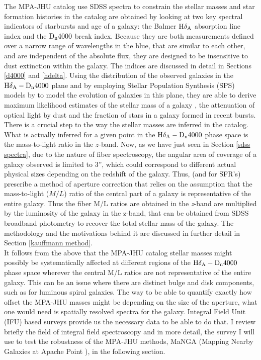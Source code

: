 The MPA-JHU catalog use SDSS spectra to constrain the stellar masses and star formation histories in the catalog are obtained by looking at two key spectral indicators of starbursts and age of a galaxy: the Balmer ${\rm H}\delta_{\rm A}$ absorption line index and the ${\rm D}_{\rm n}4000$ break index.   Because they are both measurements defined over a narrow range of wavelengths in the blue, that are similar to each other, and are independent of the absolute flux, they are designed to be insensitive to dust extinction within the galaxy. The indices are discussed in detail in Sections \ref{d4000} and \ref{hdelta}. Using the distribution of the observed galaxies in the ${\rm H}\delta_{\rm A}-{\rm D}_{\rm n}4000$ plane and by employing Stellar Population Synthesis (SPS) models by \citet{bruzual_stellar_2003-1} to model the evolution of galaxies in this plane, they are able to derive maximum likelihood estimates of the stellar mass of a galaxy \citep{kauffmann_stellar_2003}, the attenuation of optical light by dust and the fraction of stars in a galaxy formed in recent bursts.\\

There is a crucial step to the way the stellar masses are inferred in the catalog. What is actually inferred for a given point in the ${\rm H}\delta_{\rm A}-{\rm D}_{\rm n}4000$ phase space is the mass-to-light ratio in the $z$-band. Now, as we have just seen in Section \ref{sdss spectra}, due to the nature of fiber spectroscopy, the angular area of coverage of a galaxy observed is limited to 3'', which could correspond to different actual physical sizes depending on the redshift of the galaxy. Thus, \citet{kauffmann_stellar_2003} (and \citet{brinchmann_physical_2004} for SFR's) prescribe a method of aperture correction that relies on the assumption that the mass-to-light ($M/L$) ratio of the central part of a galaxy is representative of the entire galaxy. Thus the fiber M/L ratios are obtained in the \emph{z}-band are multiplied by the luminosity of the galaxy in the z-band, that can be obtained from SDSS broadband photometry to recover the total stellar mass of the galaxy. The methodology and the motivations behind it are discussed in further detail in Section \ref{kauffmann method}.\\

It follows from the above that the MPA-JHU catalog stellar masses might possibly be systematically affected at different regions of the ${\rm H}\delta_{\rm A}-{\rm D}_{\rm n}4000$ phase space wherever the central M/L ratios are not representative of the entire galaxy. This can be an issue where there are distinct bulge and disk components, such as for luminous spiral galaxies. The way to be able to quantify exactly how offset the MPA-JHU masses might be depending on the size of the aperture, what one would need is spatially resolved spectra for the galaxy. Integral Field Unit (IFU) based surveys provide us the necessary data to be able to do that. I review briefly the field of integral field spectroscopy and in more detail, the survey I will use to test the robustness of the MPA-JHU methods, MaNGA (Mapping Nearby Galaxies at Apache Point \citep{bundy_overview_2014}), in the following section.\\


